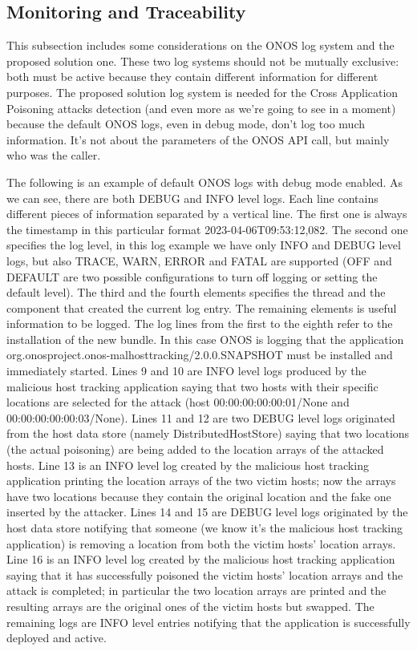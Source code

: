 \documentclass[a4paper,10pt]{memoir}
\begin{document}
\subsection{Monitoring and Traceability}
This subsection includes some considerations on the ONOS log system and the proposed solution one. These two log systems should not be mutually exclusive: both must be active because they contain different information for different purposes. The proposed solution log system is needed for the Cross Application Poisoning attacks detection (and even more as we're going to see in a moment) because the default ONOS logs, even in debug mode, don't log too much information. It's not about the parameters of the ONOS API call, but mainly who was the caller.
\medskip

The following is an example of default ONOS logs with debug mode enabled. As we can see, there are both DEBUG and INFO level logs. Each line contains different pieces of information separated by a vertical line. The first one is always the timestamp in this particular format 2023-04-06T09:53:12,082. The second one specifies the log level, in this log example we have only INFO and DEBUG level logs, but also TRACE, WARN, ERROR and FATAL are supported (OFF and DEFAULT are two possible configurations to turn off logging or setting the default level). The third and the fourth elements specifies the thread and the component that created the current log entry. The remaining elements is useful information to be logged. The log lines from the first to the eighth refer to the installation of the new bundle. In this case ONOS is logging that the application org.onosproject.onos-malhosttracking/2.0.0.SNAPSHOT must be installed and immediately started. Lines 9 and 10 are INFO level logs produced by the malicious host tracking application saying that two hosts with their specific locations are selected for the attack (host 00:00:00:00:00:01/None and 00:00:00:00:00:03/None). Lines 11 and 12 are two DEBUG level logs originated from the host data store (namely DistributedHostStore) saying that two locations (the actual poisoning) are being added to the location arrays of the attacked hosts. Line 13 is an INFO level log created by the malicious host tracking application printing the location arrays of the two victim hosts; now the arrays have two locations because they contain the original location and the fake one inserted by the attacker. Lines 14 and 15 are DEBUG level logs originated by the host data store notifying that someone (we know it's the malicious host tracking application) is removing a location from both the victim hosts' location arrays. Line 16 is an INFO level log created by the malicious host tracking application saying that it has successfully poisoned the victim hosts' location arrays and the attack is completed; in particular the two location arrays are printed and the resulting arrays are the original ones of the victim hosts but swapped. The remaining logs are INFO level entries notifying that the application is successfully deployed and active. 
\end{document}
